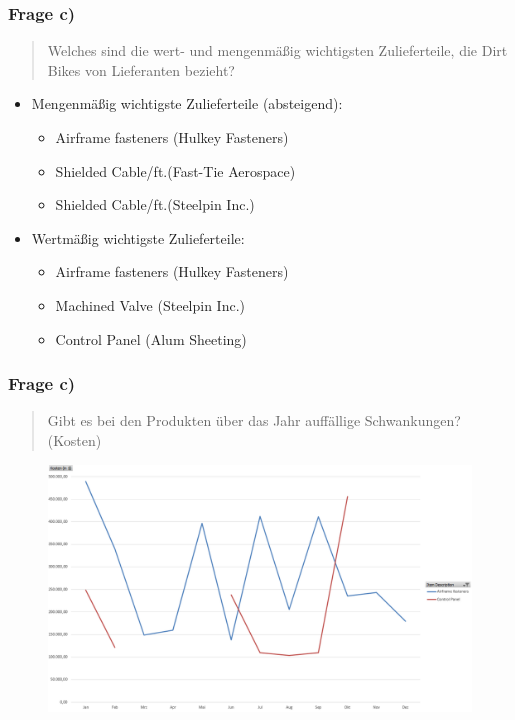\documentclass{beamer}
\begin{document}
\begin{frame}
\frametitle{Frage c)}

\begin{quote}
Welches sind die wert- und mengenm\"aßig wichtigsten Zulieferteile, die Dirt Bikes von Lieferanten bezieht?
\end{quote}

\begin{itemize}
\setlength{\itemsep}{14pt}
\item Mengenm\"aßig wichtigste Zulieferteile (absteigend):
\begin{itemize}
\item Airframe fasteners (Hulkey Fasteners)
\item Shielded Cable/ft.(Fast-Tie Aerospace)
\item Shielded Cable/ft.(Steelpin Inc.)
\end{itemize}
\item Wertm\"aßig wichtigste Zulieferteile: 
\begin{itemize}
\item Airframe fasteners (Hulkey Fasteners)
\item Machined Valve (Steelpin Inc.)
\item Control Panel (Alum Sheeting)
\end{itemize}
\end{itemize}

\end{frame}

\begin{frame}
\frametitle{Frage c)}

\begin{quote}
Gibt es bei den Produkten über das Jahr auff\"allige Schwankungen? (Kosten)
\end{quote}

\begin{figure}
\includegraphics[scale=0.34]{pivot_itemNO_costs2.PNG}
\end{figure}

\end{frame}
\end{document}
